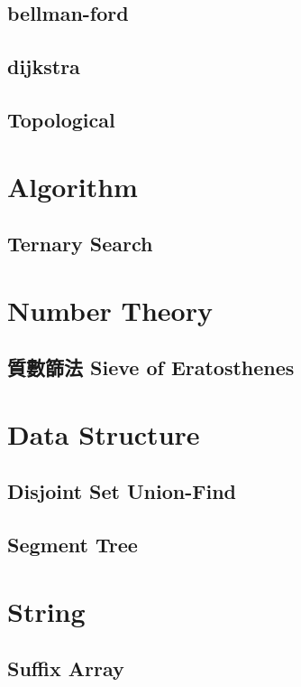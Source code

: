     \subsection{bellman-ford}
        
    \subsection{dijkstra}
        
    \subsection{Topological}
        
\section{Algorithm}
    \subsection{Ternary Search}
        
\section{Number Theory}
    \subsection{質數篩法 Sieve of Eratosthenes}
        

\section{Data Structure}
    \subsection{Disjoint Set Union-Find}
        
    \subsection{Segment Tree}
        

\section{String}
    \subsection{Suffix Array}
        
